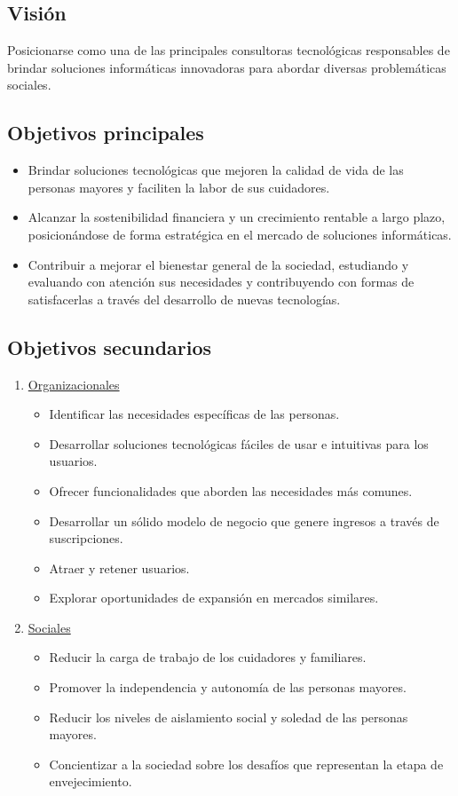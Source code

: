 \documentclass[a4paper,12pt]{article}
\begin{document}
    \subsection{Visión}
    Posicionarse como una de las principales consultoras tecnológicas responsables de brindar soluciones informáticas innovadoras para abordar diversas problemáticas sociales.
    \subsection{Objetivos principales}
    \begin{itemize}
        \item Brindar soluciones tecnológicas que mejoren la calidad de vida de las personas mayores y faciliten la labor de sus cuidadores.
        \item Alcanzar la sostenibilidad financiera y un crecimiento rentable a largo plazo, posicionándose de forma estratégica en el mercado de soluciones informáticas.
        \item Contribuir a mejorar el bienestar general de la sociedad, estudiando y evaluando con atención sus necesidades y contribuyendo con formas de satisfacerlas a través del desarrollo de nuevas tecnologías.
    \end{itemize}
    \subsection{Objetivos secundarios}
    \begin{enumerate}
        \item \underline{Organizacionales}
        \begin{itemize}
            \item Identificar las necesidades específicas de las personas.
            \item Desarrollar soluciones tecnológicas fáciles de usar e intuitivas para los usuarios.
            \item Ofrecer funcionalidades que aborden las necesidades más comunes.
            \item Desarrollar un sólido modelo de negocio que genere ingresos a través de suscripciones.
            \item Atraer y retener usuarios.
            \item Explorar oportunidades de expansión en mercados similares.
        \end{itemize}
        \item \underline{Sociales}
        \begin{itemize}
            \item Reducir la carga de trabajo de los cuidadores y familiares.
            \item Promover la independencia y autonomía de las personas mayores.
            \item Reducir los niveles de aislamiento social y soledad de las personas mayores.
            \item Concientizar a la sociedad sobre los desafíos que representan la etapa de envejecimiento.            
        \end{itemize}
    \end{enumerate}
\end{document}
